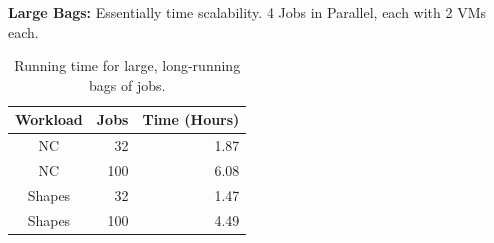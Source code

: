 \noindent \textbf{Large Bags:} Essentially time scalability. 4 Jobs in Parallel, each with 2 VMs each.  

\begin{table}
  \begin{tabular}{|c|r|r|}
    \hline
    Workload & Jobs & Time (Hours) \\
    \hline
    NC & 32  & 1.87 \\
    NC & 100  & 6.08 \\
    \hline
    Shapes & 32 & 1.47 \\
    Shapes & 100 & 4.49 \\  
    \hline
  \end{tabular}
  \caption{Running time for large, long-running bags of jobs.}
  \label{tab:100-jobs}
\end{table}






